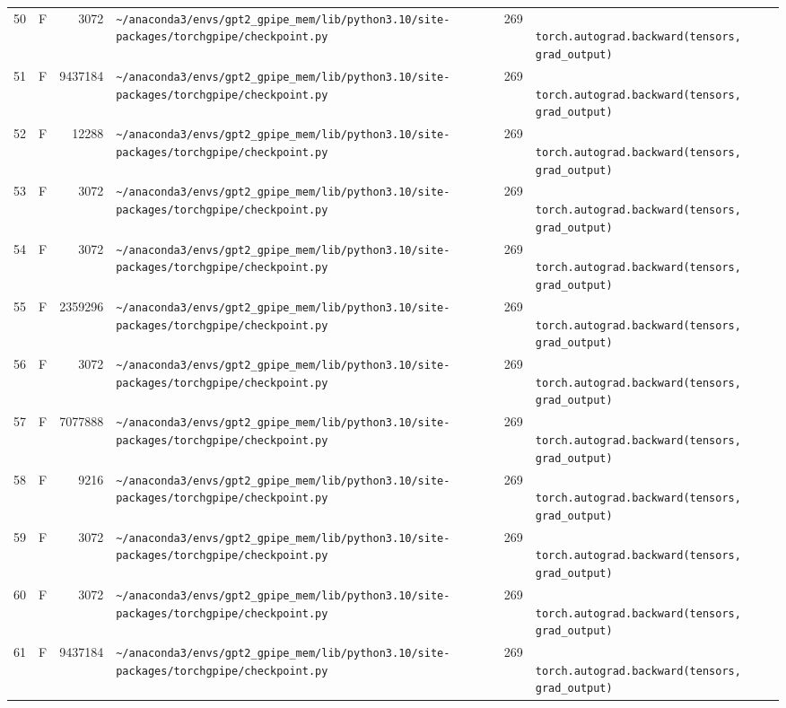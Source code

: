\documentclass{article}
\begin{document}
\begin{longtable}{r l r p{6.5cm} r p{7.0cm}}
50 & F & 3072 & \lstinline|~/anaconda3/envs/gpt2_gpipe_mem/lib/python3.10/site-packages/torchgpipe/checkpoint.py| & 269 & \lstinline|            torch.autograd.backward(tensors, grad_output)| \\
51 & F & 9437184 & \lstinline|~/anaconda3/envs/gpt2_gpipe_mem/lib/python3.10/site-packages/torchgpipe/checkpoint.py| & 269 & \lstinline|            torch.autograd.backward(tensors, grad_output)| \\
52 & F & 12288 & \lstinline|~/anaconda3/envs/gpt2_gpipe_mem/lib/python3.10/site-packages/torchgpipe/checkpoint.py| & 269 & \lstinline|            torch.autograd.backward(tensors, grad_output)| \\
53 & F & 3072 & \lstinline|~/anaconda3/envs/gpt2_gpipe_mem/lib/python3.10/site-packages/torchgpipe/checkpoint.py| & 269 & \lstinline|            torch.autograd.backward(tensors, grad_output)| \\
54 & F & 3072 & \lstinline|~/anaconda3/envs/gpt2_gpipe_mem/lib/python3.10/site-packages/torchgpipe/checkpoint.py| & 269 & \lstinline|            torch.autograd.backward(tensors, grad_output)| \\
55 & F & 2359296 & \lstinline|~/anaconda3/envs/gpt2_gpipe_mem/lib/python3.10/site-packages/torchgpipe/checkpoint.py| & 269 & \lstinline|            torch.autograd.backward(tensors, grad_output)| \\
56 & F & 3072 & \lstinline|~/anaconda3/envs/gpt2_gpipe_mem/lib/python3.10/site-packages/torchgpipe/checkpoint.py| & 269 & \lstinline|            torch.autograd.backward(tensors, grad_output)| \\
57 & F & 7077888 & \lstinline|~/anaconda3/envs/gpt2_gpipe_mem/lib/python3.10/site-packages/torchgpipe/checkpoint.py| & 269 & \lstinline|            torch.autograd.backward(tensors, grad_output)| \\
58 & F & 9216 & \lstinline|~/anaconda3/envs/gpt2_gpipe_mem/lib/python3.10/site-packages/torchgpipe/checkpoint.py| & 269 & \lstinline|            torch.autograd.backward(tensors, grad_output)| \\
59 & F & 3072 & \lstinline|~/anaconda3/envs/gpt2_gpipe_mem/lib/python3.10/site-packages/torchgpipe/checkpoint.py| & 269 & \lstinline|            torch.autograd.backward(tensors, grad_output)| \\
60 & F & 3072 & \lstinline|~/anaconda3/envs/gpt2_gpipe_mem/lib/python3.10/site-packages/torchgpipe/checkpoint.py| & 269 & \lstinline|            torch.autograd.backward(tensors, grad_output)| \\
61 & F & 9437184 & \lstinline|~/anaconda3/envs/gpt2_gpipe_mem/lib/python3.10/site-packages/torchgpipe/checkpoint.py| & 269 & \lstinline|            torch.autograd.backward(tensors, grad_output)| \\

\end{longtable}
\end{document}

